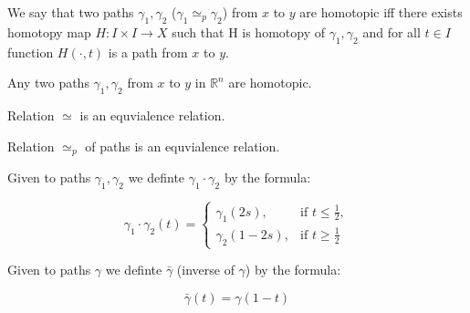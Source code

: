     \begin{definition}
        \label{def:path_homotopy}

        We say that two paths $\gamma_1, \gamma_2$ ($\gamma_1 \simeq_p \gamma_2$) from $x$ to $y$ are homotopic iff there exists homotopy map $H : I \times I \to X$
        such that H is homotopy of $\gamma_1, \gamma_2$ and for all $t \in I$ function $H(\cdot, t)$ is a path from $x$ to $y$.
    \end{definition}

    \begin{lemma}
        \label{lem:Rn_path_equiv_lemma}

        Any two paths $\gamma_1, \gamma_2$ from $x$ to $y$ in $\mathbb{R}^n$ are homotopic.
    \end{lemma}

    \begin{theorem}
        \label{thm:homotopy_equiv}

        Relation $\simeq$ is an equvialence relation.
    \end{theorem}

    \begin{theorem}
        \label{thm:path_homotopy_equiv}

        Relation $\simeq_p$ of paths is an equvialence relation.
    \end{theorem}

    \begin{definition}
        \label{def:path_composition}

        Given to paths $\gamma_1, \gamma_2$ we definte $\gamma_1 \cdot \gamma_2$ by the formula:

        $$
            \gamma_1 \cdot \gamma_2 (t) =
            \begin{cases}
            \gamma_1(2s), & \text{if } t \leq \frac{1}{2}, \\
            \gamma_2(1-2s), & \text{if } t \geq \frac{1}{2}
            \end{cases}
        $$
    \end{definition}

    \begin{definition}
        \label{def:path_inverse}

        Given to paths $\gamma$ we definte $\bar{\gamma}$ (inverse of $\gamma$) by the formula:

        $$
            \bar{\gamma}(t) = \gamma(1-t)
        $$
    \end{definition}


